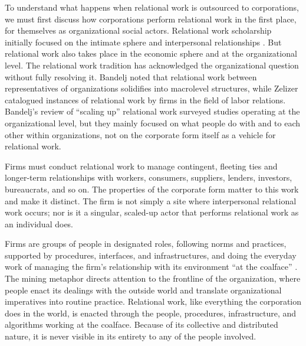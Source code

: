 \documentclass[
]{article}
\begin{document}
To understand what happens when relational work is outsourced to corporations, we must first discuss how corporations perform relational work in the first place, for themselves as organizational social actors. Relational work scholarship initially focused on the intimate sphere and interpersonal relationships \autocite[see][for a review]{bandeljRelationalWorkEconomy2020}. But relational work also takes place in the economic sphere and at the organizational level. The relational work tradition has acknowledged the organizational question without fully resolving it. Bandelj \autocite*{bandeljRelationalWorkEconomic2012} noted that relational work between representatives of organizations solidifies into macrolevel structures, while Zelizer \autocite*[156-157]{zelizerHowBecameRelational2012} catalogued instances of relational work by firms in the field of labor relations. Bandelj's \autocite*{bandeljRelationalWorkEconomy2020} review of ``scaling up'' relational work surveyed studies operating at the organizational level, but they mainly focused on what people do with and to each other within organizations, not on the corporate form itself as a vehicle for relational work.

Firms must conduct relational work to manage contingent, fleeting ties and longer-term relationships with workers, consumers, suppliers, lenders, investors, bureaucrats, and so on. The properties of the corporate form matter to this work and make it distinct. The firm is not simply a site where interpersonal relational work occurs; nor is it a singular, scaled-up actor that performs relational work as an individual does.

Firms are groups of people in designated roles, following norms and practices, supported by procedures, interfaces, and infrastructures, and doing the everyday work of managing the firm's relationship with its environment ``at the coalface'' \autocite{grayGoverningOrganizationInterpreting2014,huisingNudgeCultureBack2018}. The mining metaphor directs attention to the frontline of the organization, where people enact its dealings with the outside world and translate organizational imperatives into routine practice. Relational work, like everything the corporation does in the world, is enacted through the people, procedures, infrastructure, and algorithms working at the coalface. Because of its collective and distributed nature, it is never visible in its entirety to any of the people involved.
\end{document}
